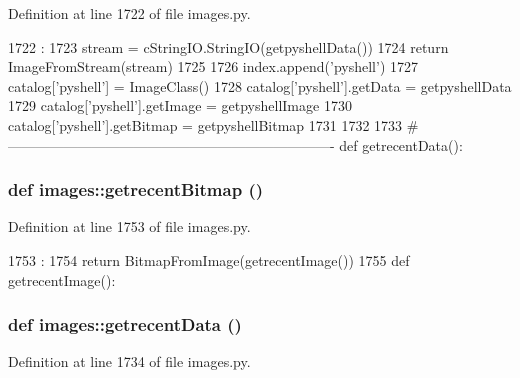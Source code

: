 Definition at line 1722 of file images.py.


\begin{DoxyCode}
1722                      :
1723     stream = cStringIO.StringIO(getpyshellData())
1724     return ImageFromStream(stream)
1725 
1726 index.append('pyshell')
1727 catalog['pyshell'] = ImageClass()
1728 catalog['pyshell'].getData = getpyshellData
1729 catalog['pyshell'].getImage = getpyshellImage
1730 catalog['pyshell'].getBitmap = getpyshellBitmap
1731 
1732 
1733 #----------------------------------------------------------------------
def getrecentData():
\end{DoxyCode}
\hypertarget{namespaceimages_a1d09a0c4f10b5778e11601655eb9c7a3}{
\subsubsection[{getrecentBitmap}]{\setlength{\rightskip}{0pt plus 5cm}def images::getrecentBitmap ()}}
\label{namespaceimages_a1d09a0c4f10b5778e11601655eb9c7a3}


Definition at line 1753 of file images.py.


\begin{DoxyCode}
1753                      :
1754     return BitmapFromImage(getrecentImage())
1755 
def getrecentImage():
\end{DoxyCode}
\hypertarget{namespaceimages_a7d91a84ff79bae57a331bcec2c4a9988}{
\subsubsection[{getrecentData}]{\setlength{\rightskip}{0pt plus 5cm}def images::getrecentData ()}}
\label{namespaceimages_a7d91a84ff79bae57a331bcec2c4a9988}


Definition at line 1734 of file images.py.


